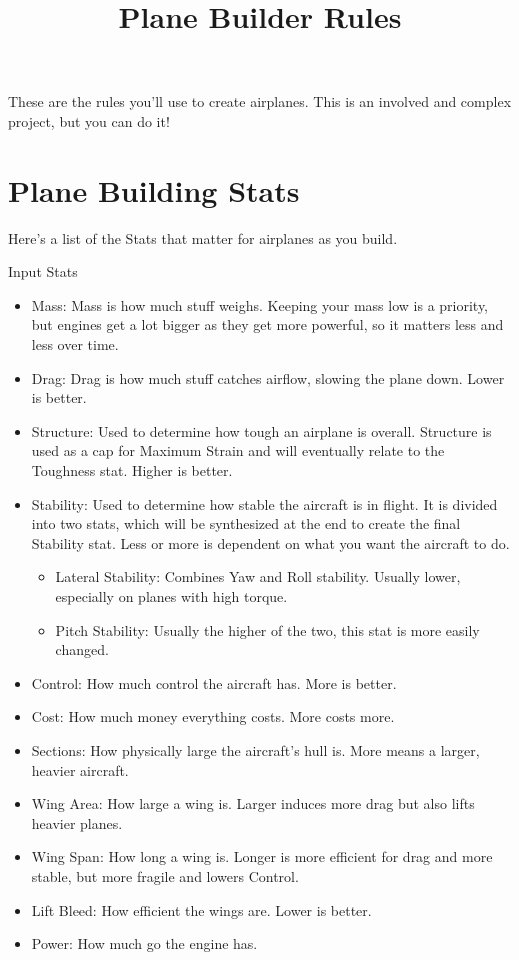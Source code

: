 \documentclass{article}
\title{Plane Builder Rules}
\begin{document}
These are the rules you'll use to create airplanes. This is an involved
and complex project, but you can do it!

\section{Plane Building Stats}
\label{_Plane Building Stats}

Here's a list of the Stats that matter for airplanes as you build.

Input Stats

\begin{itemize}
    \item          Mass: Mass is how much stuff weighs. Keeping your mass low is a
          priority, but engines get a lot bigger as they get more powerful, so
          it matters less and less over time.
    \item          Drag: Drag is how much stuff catches airflow, slowing the plane
          down. Lower is better.
    \item          Structure: Used to determine how tough an airplane is overall.
          Structure is used as a cap for Maximum Strain and will eventually
          relate to the Toughness stat. Higher is better.
    \item          Stability: Used to determine how stable the aircraft is in
          flight. It is divided into two stats, which will be synthesized at the
          end to create the final Stability stat. Less or more is dependent on
          what you want the aircraft to do.

          \begin{itemize}
              \item                    Lateral Stability: Combines Yaw and Roll stability. Usually
                    lower, especially on planes with high torque.
              \item                    Pitch Stability: Usually the higher of the two, this stat is
                    more easily changed.
          \end{itemize}
\end{itemize}

\begin{itemize}
    \item          Control: How much control the aircraft has. More is better.
    \item          Cost: How much money everything costs. More costs more.
    \item          Sections: How physically large the aircraft's hull is. More
          means a larger, heavier aircraft.
    \item          Wing Area: How large a wing is. Larger induces more drag but
          also lifts heavier planes.
    \item          Wing Span: How long a wing is. Longer is more efficient for
          drag and more stable, but more fragile and lowers Control.
    \item          Lift Bleed: How efficient the wings are. Lower is better.
    \item          Power: How much go the engine has.
\end{itemize}
\end{document}
